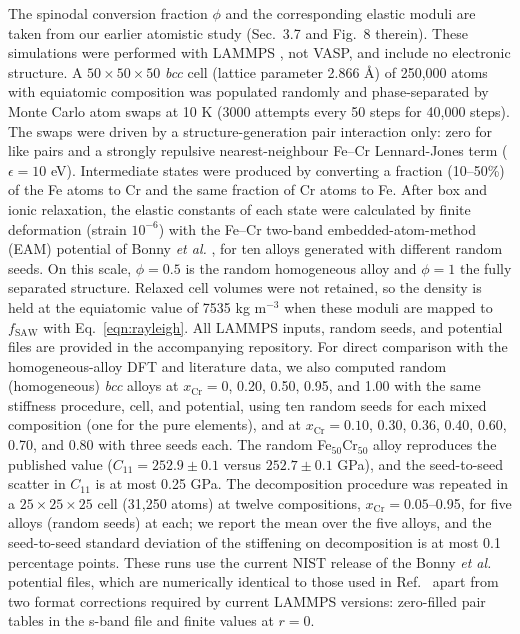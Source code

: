 \documentclass[final,3p,times]{elsarticle}
\begin{document}
The spinodal conversion fraction $\phi$ and the corresponding elastic moduli are taken from our earlier atomistic study \cite{al2023detecting} (Sec.~3.7 and Fig.~8 therein). These simulations were performed with LAMMPS \cite{plimpton1995}, not VASP, and include no electronic structure. A $50\times50\times50$ \textit{bcc} cell (lattice parameter 2.866 \AA) of 250,000 atoms with equiatomic composition was populated randomly and phase-separated by Monte Carlo atom swaps at 10 K (3000 attempts every 50 steps for 40,000 steps). The swaps were driven by a structure-generation pair interaction only: zero for like pairs and a strongly repulsive nearest-neighbour Fe--Cr Lennard-Jones term ($\epsilon=10$ eV). Intermediate states were produced by converting a fraction (10--50\%) of the Fe atoms to Cr and the same fraction of Cr atoms to Fe. After box and ionic relaxation, the elastic constants of each state were calculated by finite deformation (strain $10^{-6}$) with the Fe--Cr two-band embedded-atom-method (EAM) potential of Bonny \textit{et al.} \cite{bonny2011iron}, for ten alloys generated with different random seeds. On this scale, $\phi=0.5$ is the random homogeneous alloy and $\phi=1$ the fully separated structure. Relaxed cell volumes were not retained, so the density is held at the equiatomic value of 7535 kg m$^{-3}$ when these moduli are mapped to $f_{\mathrm{SAW}}$ with Eq.~\ref{eqn:rayleigh}. All LAMMPS inputs, random seeds, and potential files are provided in the accompanying repository. For direct comparison with the homogeneous-alloy DFT and literature data, we also computed random (homogeneous) \textit{bcc} alloys at $x_{\mathrm{Cr}}=0$, 0.20, 0.50, 0.95, and 1.00 with the same stiffness procedure, cell, and potential, using ten random seeds for each mixed composition (one for the pure elements), and at $x_{\mathrm{Cr}}=0.10$, 0.30, 0.36, 0.40, 0.60, 0.70, and 0.80 with three seeds each. The random Fe$_{50}$Cr$_{50}$ alloy reproduces the published value ($C_{11}=252.9\pm0.1$ versus $252.7\pm0.1$ GPa), and the seed-to-seed scatter in $C_{11}$ is at most 0.25 GPa. The decomposition procedure was repeated in a $25\times25\times25$ cell (31,250 atoms) at twelve compositions, $x_{\mathrm{Cr}}=0.05$--0.95, for five alloys (random seeds) at each; we report the mean over the five alloys, and the seed-to-seed standard deviation of the stiffening on decomposition is at most 0.1 percentage points. These runs use the current NIST release of the Bonny \textit{et al.} potential files, which are numerically identical to those used in Ref.~\cite{al2023detecting} apart from two format corrections required by current LAMMPS versions: zero-filled pair tables in the s-band file and finite values at $r=0$.
\end{document}
